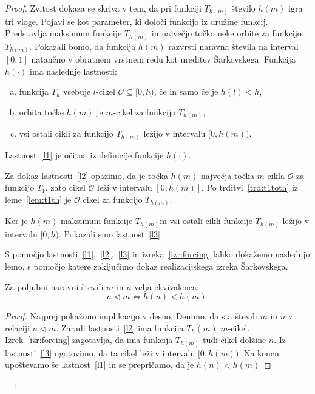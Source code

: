 \documentclass[../TG_magistrsko_delo_sections.tex]{subfiles}
\begin{document}
\begin{proof}
Zvitost dokaza se skriva v tem, da pri funkciji $T_{h(m)}$ število $h(m)$ igra tri vloge. Pojavi se kot parameter, ki določi funkcijo iz družine funkcij. Predstavlja maksimum funkcije $T_{h(m)}$ in največjo točko neke orbite za funkcijo $T_{h(m)}$. Pokazali bomo, da funkcija $h(m)$ razvrsti naravna števila na interval $[0, 1]$ natančno v obratnem vrstnem redu kot ureditev Šarkovskega.
Funkcija $h(\cdot)$ ima naslednje lastnosti:
\begin{enumerate}[(a)]
\item funkcija $T_h$  vsebuje $l$-cikel $\mathcal{O}\subseteq [0, h)$, če in samo če je $h(l)<h$,\label{l1}
\item orbita točke $h(m)$ je $m$-cikel za funkcijo $T_{h(m)}$,\label{l2}
\item vsi ostali cikli za funkcijo $T_{h(m)}$ ležijo v intervalu $[0, h(m)).$\label{l3}
\end{enumerate}

Lastnost~\ref{l1} je očitna iz definicije funkcije $h(\cdot)$.

Za dokaz lastnosti~\ref{l2} opazimo, da je točka $h(m)$ največja točka $m$-cikla $\mathcal{O}$ za funkcijo $T_1$, zato cikel $\mathcal{O}$ leži v intervalu $[0, h(m)]$. Po trditvi~\ref{trd:t1toth} iz leme~\ref{lem:t1th} je $\mathcal{O}$ cikel za funkcijo $T_{h(m)}$. 

Ker je $h(m)$ maksimum funkcije $T_{h(m)}$m vsi ostali cikli funkcije $T_{h(m)}$ ležijo v intervalu $[0, h)$. Pokazali smo lastnost~\ref{l3}

S pomočjo lastnosti~\ref{l1},~\ref{l2},~\ref{l3} in izreka~\ref{izr:forcing} lahko dokažemo naslednjo lemo, s pomočjo katere zaključimo dokaz realizacijskega izreka Šarkovskega.

\begin{lema}\label{lem:<rel}
Za poljubni naravni števili $m$ in $n$ velja ekvivalenca:
$$ n \triangleleft m \iff h(n) < h(m).$$
\end{lema}
\begin{proof}
Najprej pokažimo implikacijo v desno. Denimo, da sta števili $m$ in $n$ v relaciji $n \triangleleft m$. Zaradi lastnosti~\ref{l2} ima funkcija $T_h(m)$ $m$-cikel. Izrek~\ref{izr:forcing} zagotavlja, da ima funkcija $T_{h(m)}$ tudi cikel dolžine $n$. Iz lastnosti~\ref{l3} ugotovimo, da ta cikel leži v intervalu $[0, h(m))$. Na koncu upoštevamo še lastnost~\ref{l1} in se prepričamo, da je $h(n) < h(m)$


\end{proof}
\end{proof}
\end{document}
